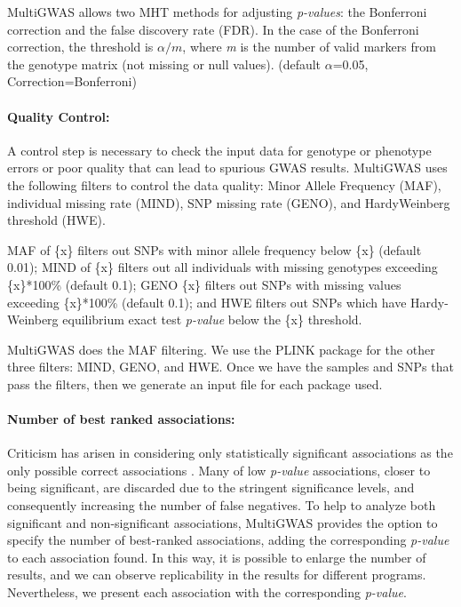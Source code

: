 MultiGWAS allows two MHT methods for adjusting \emph{p-values}: the Bonferroni correction and the false discovery rate (FDR). In the case of the Bonferroni correction, the threshold is $\alpha/m$, where \emph{m }is the number of valid markers from the genotype matrix (not missing or null values). (default $\alpha$=0.05, Correction=Bonferroni)

\paragraph{Quality Control:}

A control step is necessary to check the input data for genotype or phenotype errors or poor quality that can lead to spurious GWAS results. MultiGWAS uses the following filters to control the data quality: Minor Allele Frequency (MAF), individual missing rate (MIND), SNP missing rate (GENO), and Hardy\-Weinberg threshold (HWE). 

MAF of \{x\} filters out SNPs with minor allele frequency below \{x\} (default 0.01); MIND of \{x\} filters out all individuals with missing genotypes exceeding \{x\}{*}100\% (default 0.1); GENO \{x\} filters out SNPs with missing values exceeding \{x\}{*}100\% (default 0.1); and HWE filters out SNPs which have Hardy-Weinberg equilibrium exact test \emph{p-value} below the \{x\} threshold.

MultiGWAS does the MAF filtering. We use the PLINK package \cite{Gumpinger2018} for the other three filters: MIND, GENO, and HWE. Once we have the samples and SNPs that pass the filters, then we generate an input file for each package used. 

\paragraph{Number of best ranked associations:}
Criticism has arisen in considering only statistically significant associations as the only possible correct associations \cite{Thomson2011,Kaler2019}. Many of low \emph{p-value} associations, closer to being significant, are discarded due to the stringent significance levels, and consequently increasing the number of false negatives. To help to analyze both significant and non-significant associations, MultiGWAS provides the option to specify the number of best-ranked associations, adding the corresponding  \emph{p-value} to each association found.  In this way, it is possible to enlarge the number of results, and we can observe replicability in the results for different programs. Nevertheless, we present each association with the corresponding \emph{p-value}.%




